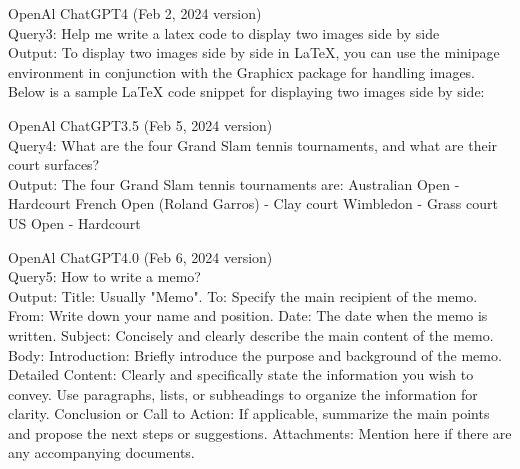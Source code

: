 \documentclass{mcmthesis}
\begin{document}
\begin{ReportAiUse}{9}
OpenAl ChatGPT4 (Feb 2, 2024 version)\\
Query3: Help me write a latex code to display two images side by side\\
Output: To display two images side by side in LaTeX, you can use the minipage environment in conjunction with the Graphicx package for handling images. Below is a sample LaTeX code snippet for displaying two images side by side:


OpenAl ChatGPT3.5 (Feb 5, 2024 version)\\
Query4: What are the four Grand Slam tennis tournaments, and what are their court surfaces?\\
Output: The four Grand Slam tennis tournaments are:
Australian Open - Hardcourt
French Open (Roland Garros) - Clay court
Wimbledon - Grass court
US Open - Hardcourt



OpenAl ChatGPT4.0 (Feb 6, 2024 version)\\
Query5: How to write a memo?\\
Output: Title: Usually "Memo".
To: Specify the main recipient of the memo.
From: Write down your name and position.
Date: The date when the memo is written.
Subject: Concisely and clearly describe the main content of the memo.
Body:
Introduction: Briefly introduce the purpose and background of the memo.
Detailed Content: Clearly and specifically state the information you wish to convey. Use paragraphs, lists, or subheadings to organize the information for clarity.
Conclusion or Call to Action: If applicable, summarize the main points and propose the next steps or suggestions.
Attachments: Mention here if there are any accompanying documents.

\end{ReportAiUse}
\end{document}
